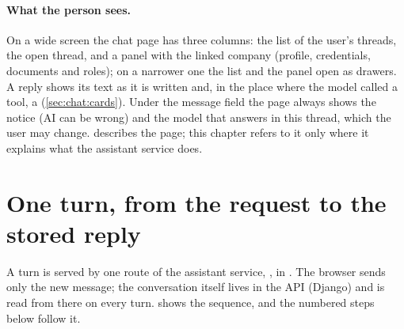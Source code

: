 \paragraph{What the person sees.} On a wide screen the chat page has three columns: the list of
the user's threads, the open thread, and a panel with the linked company (profile, credentials,
documents and roles); on a narrower one the list and the panel open as drawers. A reply shows its text as it is written and, in the place where the model called a
tool, a  (\cref{sec:chat:cards}). Under the message field the page always
shows the notice  (AI can be wrong) and the model that answers in this
thread, which the user may change.  describes the page; this chapter refers to
it only where it explains what the assistant service does.


\section{One turn, from the request to the stored reply}\label{sec:chat:turn}

A turn is served by one route of the assistant service, , in
. The browser sends only the new message; the conversation itself lives in
the API (Django) and is read from there on every turn.  shows the
sequence, and the numbered steps below follow it.

